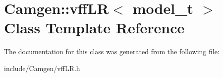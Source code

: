 \hypertarget{a00570}{\section{Camgen\-:\-:vff\-L\-R$<$ model\-\_\-t $>$ Class Template Reference}
\label{a00570}
}


The documentation for this class was generated from the following file\-:\begin{DoxyCompactItemize}
\item 
include/\-Camgen/vff\-L\-R.\-h\end{DoxyCompactItemize}
